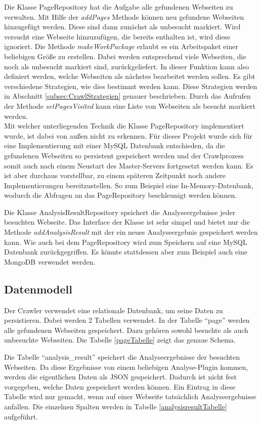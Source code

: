 Die Klasse PageRepository hat die Aufgabe alle gefundenen Webseiten zu verwalten. Mit Hilfe der \textit{addPages} Methode können neu gefundene Webseiten hinzugefügt werden. Diese sind dann zunächst als unbesucht markiert. Wird versucht eine Webseite hinzuzufügen, die bereits enthalten ist, wird diese ignoriert. Die Methode \textit{makeWorkPackage} erlaubt es ein Arbeitspaket einer beliebigen Größe zu erstellen. Dabei werden entsprechend viele Webseiten, die noch als unbesucht markiert sind, zurückgeliefert. In dieser Funktion kann also definiert werden, welche Webseiten als nächstes bearbeitet werden sollen. Es gibt verschiedene Strategien, wie dies bestimmt werden kann. Diese Strategien werden in Abschnitt \ref{subsec:CrawlStrategien} genauer beschrieben. Durch das Aufrufen der Methode \textit{setPagesVisited} kann eine Liste von Webseiten als besucht markiert werden. \\
Mit welcher unterliegenden Technik die Klasse PageRepository implementiert wurde, ist dabei von außen nicht zu erkennen. Für dieses Projekt wurde sich für eine Implementierung mit einer MySQL Datenbank entschieden, da die gefundenen Webseiten so persistent gespeichert werden und der Crawlprozess somit auch nach einem Neustart des Master-Servers fortgesetzt werden kann. Es ist aber durchaus vorstellbar, zu einem späteren Zeitpunkt noch andere Implementierungen bereitzustellen. So zum Beispiel eine In-Memory-Datenbank, wodurch die Abfragen an das PageRepository beschleunigt werden können.

Die Klasse AnalysisResultRepository speichert die Analyseergebnisse jeder besuchten Webseite. Das Interface der Klasse ist sehr simpel und bietet nur die Methode \textit{addAnalysisResult} mit der ein neues Analyseergebnis gespeichert werden kann. Wie auch bei dem PageRepository wird zum Speichern auf eine MySQL Datenbank zurückgegriffen. Es könnte stattdessen aber zum Beispiel auch eine MongoDB verwendet werden.

\subsection{Datenmodell}
Der Crawler verwendet eine relationale Datenbank, um seine Daten zu persistieren. Dabei werden 2 Tabellen verwendet. In der Tabelle \enquote{page} werden alle gefundenen Webseiten gespeichert. Dazu gehören sowohl besuchte als auch unbesuchte Webseiten. Die Tabelle \ref{pageTabelle} zeigt das genaue Schema.

Die Tabelle \enquote{analysis\_result} speichert die Analyseergebnisse der besuchten Webseiten. Da diese Ergebnisse von einem beliebigen Analyse-Plugin kommen, werden die eigentlichen Daten als JSON gespeichert. Dadurch ist nicht fest vorgegeben, welche Daten gespeichert werden können. Ein Eintrag in diese Tabelle wird nur gemacht, wenn auf einer Webseite tatsächlich Analyseergebnisse anfallen. Die einzelnen Spalten werden in Tabelle \ref{analysisresultTabelle} aufgeführt.


